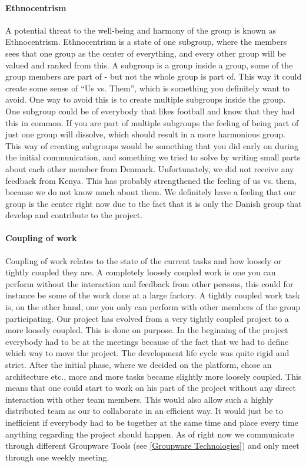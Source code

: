 \paragraph{Ethnocentrism}
A potential threat to the well-being and harmony of the group is known as Ethnocentrism. Ethnocentrism is a state of one subgroup, where the members sees that one group as the center of everything, and every other group will be valued and ranked from this. A subgroup is a group inside a group, some of the group members are part of - but not the whole group is part of. This way it could create some sense of ``Us vs. Them'', which is something you definitely want to avoid. One way to avoid this is to create multiple subgroups inside the group. One subgroup could be of everybody that likes football and know that they had this in common. If you are part of multiple subgroups the feeling of being part of just one group will dissolve, which should result in a more harmonious group.
This way of creating subgroups would be something that you did early on during the initial communication, and something we tried to solve by writing small parts about each other member from Denmark. Unfortunately, we did not receive any feedback from Kenya. This has probably strengthened the feeling of us vs. them, because we do not know much about them. We definitely have a feeling that our group is the center right now due to the fact that it is only the Danish group that develop and contribute to the project.

\paragraph{Coupling of work}
Coupling of work relates to the state of the current tasks and how loosely or tightly coupled they are. A completely loosely coupled work is one you can perform without the interaction and feedback from other persons, this could for instance be some of the work done at a large factory. A tightly coupled work task is, on the other hand, one you only can perform with other members of the group participating. Our project has evolved from a very tightly coupled project to a more loosely coupled. This is done on purpose. In the beginning of the project everybody had to be at the meetings because of the fact that we had to define which way to move the project. The development life cycle was quite rigid and strict. After the initial phase, where we decided on the platform, chose an architecture etc., more and more tasks became slightly more loosely coupled. This means that one could start to work on his part of the project without any direct interaction with other team members. This would also allow such a highly distributed team as our to collaborate in an efficient way. It would just be to inefficient if everybody had to be together at the same time and place every time anything regarding the project should happen. As of right now we communicate through different Groupware Tools (see \ref{Groupware Technologies}) and only meet through one weekly meeting.


